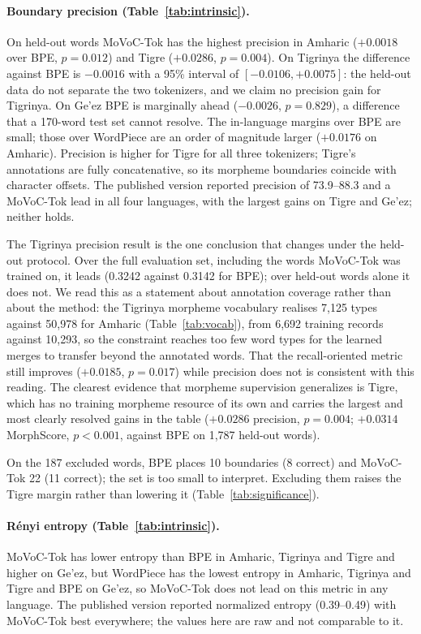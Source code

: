 \documentclass[11pt]{article}
\newcommand{\movoctok}{MoVoC-Tok}
\begin{document}
\paragraph{Boundary precision (Table~\ref{tab:intrinsic}).} On held-out words
\movoctok{} has the highest precision in Amharic ($+0.0018$ over BPE,
$p = 0.012$) and Tigre ($+0.0286$, $p = 0.004$). On Tigrinya the difference
against BPE is $-0.0016$ with a 95\% interval of $[-0.0106, +0.0075]$: the
held-out data do not separate the two tokenizers, and we claim no precision
gain for Tigrinya. On Ge'ez BPE is marginally ahead ($-0.0026$, $p = 0.829$),
a difference that a 170-word test set cannot resolve. The in-language margins
over BPE are small; those over WordPiece are an order of magnitude larger
($+0.0176$ on Amharic). Precision is higher for Tigre for all three
tokenizers; Tigre's annotations are fully concatenative, so its morpheme
boundaries coincide with character offsets. The published version reported
precision of 73.9--88.3 and a \movoctok{} lead in all four languages, with the
largest gains on Tigre and Ge'ez; neither holds.

The Tigrinya precision result is the one conclusion that changes under the
held-out protocol. Over the full evaluation set, including the words
\movoctok{} was trained on, it leads (0.3242 against 0.3142 for BPE); over
held-out words alone it does not. We read this as a statement about annotation
coverage rather than about the method: the Tigrinya morpheme vocabulary
realises 7,125 types against 50,978 for Amharic (Table~\ref{tab:vocab}), from
6,692 training records against 10,293, so the constraint reaches too few word
types for the learned merges to transfer beyond the annotated words. That the
recall-oriented metric still improves ($+0.0185$, $p = 0.017$) while precision
does not is consistent with this reading. The clearest evidence that morpheme
supervision generalizes is Tigre, which has no training morpheme resource of
its own and carries the largest and most clearly resolved gains in the table
($+0.0286$ precision, $p = 0.004$; $+0.0314$ MorphScore, $p < 0.001$, against
BPE on 1,787 held-out words).

On the 187 excluded words, BPE places 10 boundaries (8 correct) and
\movoctok{} 22 (11 correct); the set is too small to interpret. Excluding
them raises the Tigre margin rather than lowering it
(Table~\ref{tab:significance}).

\paragraph{Rényi entropy (Table~\ref{tab:intrinsic}).} \movoctok{} has lower
entropy than BPE in Amharic, Tigrinya and Tigre and higher on Ge'ez, but
WordPiece has the lowest entropy in Amharic, Tigrinya and Tigre and BPE on
Ge'ez, so \movoctok{} does not lead on this metric in any language. The
published version reported normalized entropy (0.39--0.49) with \movoctok{}
best everywhere; the values here are raw and not comparable to it.
\end{document}
